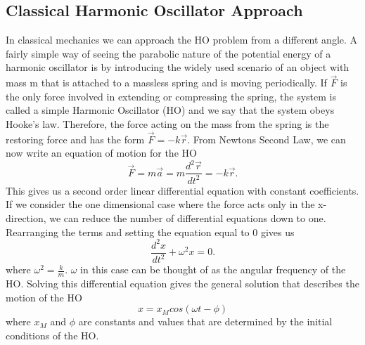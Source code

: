 \documentclass{article}
\newcommand{\be}{\begin{equation}}
\newcommand{\ee}{\end{equation}}
\begin{document}
\subsection*{Classical Harmonic Oscillator Approach}
In classical mechanics we can approach the HO problem from a different angle. 
A fairly simple way of seeing the parabolic nature of the potential energy of a harmonic oscillator is by introducing the widely used scenario of an object with mass m that is attached to a massless spring and is moving periodically. 
If $\vec{F}$ is the only force involved in extending or compressing the spring, the system is called a simple Harmonic Oscillator (HO) and we say that the system obeys Hooke's law. 
Therefore, the force acting on the mass from the spring is the restoring force and has the form $\vec{F} = - k \vec{r}$.
From Newtons Second Law, we can now write an equation of motion for the HO
\be
\vec{F}=m\vec{a}=m\frac{d^2\vec{r}}{dt^2}=-k\vec{r} .
\ee
This gives us a second order linear differential equation with constant coefficients. 
If we consider the one dimensional case where the force acts only in the x-direction, we can reduce the number of differential equations down to one. 
Rearranging the terms and setting the equation equal to 0 gives us
\be
\frac{d^2x}{dt^2} + \omega^2 x = 0.
\ee
where $\omega^2 = \frac{k}{m}$. $\omega$ in this case can be thought of as the angular frequency of the HO. Solving this differential equation gives the general solution that
describes the motion of the HO
\be
x=x_Mcos(\omega t - \phi)
\ee
where $x_M$ and $\phi$ are constants and values that are determined by the initial conditions of the HO.
\end{document}
